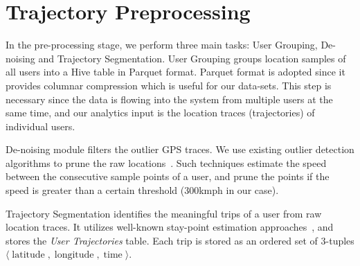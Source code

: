 \section{Trajectory Preprocessing}
\label{sec:preprocess}

In the pre-processing stage, we perform three main tasks: User Grouping, De-noising and Trajectory Segmentation. User Grouping groups location samples of all users into a Hive table in Parquet format. Parquet format is adopted since it provides columnar compression which is useful for our data-sets. This step is necessary since the data is flowing into the system from multiple users at the same time, and our analytics input is the location traces (trajectories) of individual users.

De-noising module filters the outlier GPS traces. We use existing outlier detection algorithms to prune the raw locations~\cite{Yuan2013,Zheng2009}. Such techniques estimate the speed between the consecutive sample points of a user, and prune the points if the speed is greater than a certain threshold (\unit{300}{kmph} in our case).

Trajectory Segmentation identifies the meaningful trips of a user from raw location traces. It utilizes well-known stay-point estimation approaches~\cite{trajcut3}, and stores the \textit{User Trajectories} table. Each trip is stored as an ordered set of 3-tuples $\langle \operatorname{latitude},\operatorname{longitude}, \operatorname{time} \rangle$.